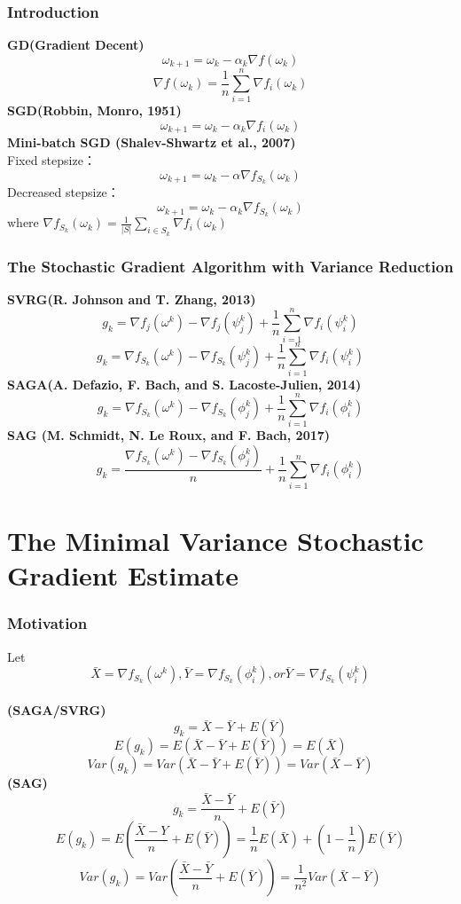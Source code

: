 \documentclass{beamer}
\begin{document}
\begin{frame}
	\frametitle{\bf Introduction} 
	\textbf { GD(Gradient Decent)}
	$$\omega_{k+1}=\omega_k - \alpha_k \nabla f(\omega_k)$$
	$$ \nabla f(\omega_k) = \frac{1}{n} \sum_{i=1}^n\nabla f_i(\omega_k) $$
	\textbf { SGD(Robbin, Monro, 1951)}  
	$$\omega_{k+1}=\omega_k - \alpha_k \nabla f_i(\omega_k) $$
    \textbf { Mini-batch SGD (Shalev-Shwartz et al., 2007)} \\
    Fixed stepsize：$$\omega_{k+1}=\omega_k - \alpha \nabla f_{S_k}(\omega_k)$$
    Decreased stepsize：$$\omega_{k+1}=\omega_k - \alpha_k \nabla f_{S_k}(\omega_k) $$
    $\text{where }\nabla f_{S_k}(\omega_k)=\frac{1}{|S|} \sum_{i\in S_k} \nabla f_i(\omega_k)$
\end{frame}

\begin{frame}
	\frametitle{\bf The Stochastic Gradient Algorithm with Variance Reduction} 
			\textbf { SVRG(R. Johnson and T. Zhang, 2013)}
$$g_k = \nabla f_j(\omega^k)-\nabla f_j(\psi_j^k)+ \frac{1}{n} \sum_{i=1}^{n}\nabla f_i(\psi_i^k)$$
$$g_k = \nabla f_{S_k}(\omega^k)-\nabla f_{S_k}(\psi_j^k)+ \frac{1}{n} \sum_{i=1}^{n}\nabla f_i(\psi_i^k)$$
			\textbf { SAGA(A. Defazio, F. Bach, and S. Lacoste-Julien, 2014)}
	$$g_k = \nabla f_{S_k}(\omega^k)-\nabla f_{S_k}(\phi_j^k)+ \frac{1}{n} \sum_{i=1}^{n}\nabla f_i(\phi_i^k)$$
\textbf { SAG (M. Schmidt, N. Le Roux, and F. Bach, 2017)}
$$g_k = \frac{\nabla f_{S_k}(\omega^k)-\nabla f_{S_k}(\phi_j^k)}{n} + \frac{1}{n}\sum_{i=1}^{n}\nabla f_i(\phi_i^k)$$
\end{frame}

\section{The Minimal Variance Stochastic Gradient Estimate}

\begin{frame}
	\frametitle{\bf Motivation} 
    Let $$\bar{X} = \nabla f_{S_k}(\omega^k), \bar{Y} = \nabla f_{S_k}(\phi_i^k), or \bar{Y} = \nabla f_{S_k}(\psi_i^k)$$\\
   \textbf { (SAGA/SVRG)}
    $$g_k =\bar{X}-\bar{Y}+E(\bar{Y}) $$
    $$E(g_k) = E(\bar{X}-\bar{Y}+E(\bar{Y})) = E(\bar{X})$$
    $$Var(g_k) = Var(\bar{X}-\bar{Y}+E(\bar{Y}))=Var(\bar{X}-\bar{Y})$$
    \textbf { (SAG)}
    $$g_k = \frac{\bar{X}-\bar{Y}}{n}+E(\bar{Y}) $$
	$$E(g_k) = E(\frac{\bar{X}-Y}{n}+E(\bar{Y})) = \frac{1}{n}E(\bar{X})+(1-\frac{1}{n})E(\bar{Y})$$
	$$Var(g_k) = Var(\frac{\bar{X}-\bar{Y}}{n}+E(\bar{Y}))= \frac{1}{n^2} Var(\bar{X}-\bar{Y})$$
\end{frame}
\end{document}
